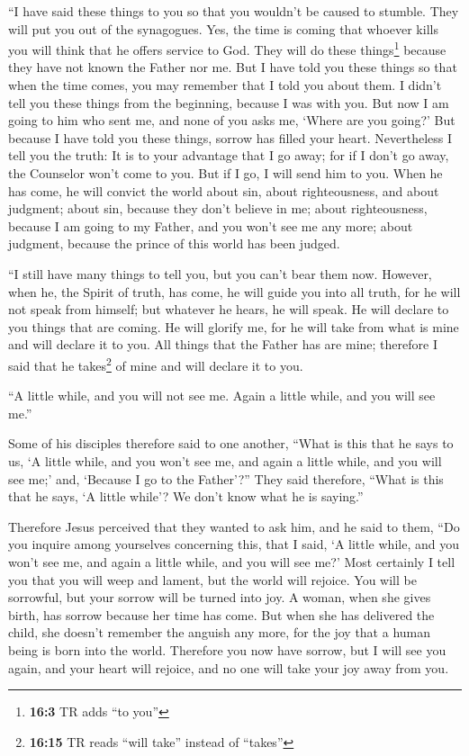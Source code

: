  ``I have said these things to you so that you wouldn't be
caused to stumble.  They will put you out of the
synagogues. Yes, the time is coming that whoever kills you will think
that he offers service to God.  They will do these
things\footnote{\textbf{16:3} TR adds ``to you''} because they have not
known the Father nor me.  But I have told you these things
so that when the time comes, you may remember that I told you about
them. I didn't tell you these things from the beginning, because I was
with you.  But now I am going to him who sent me, and none
of you asks me, `Where are you going?'  But because I have
told you these things, sorrow has filled your heart. 
Nevertheless I tell you the truth: It is to your advantage that I go
away; for if I don't go away, the Counselor won't come to you. But if I
go, I will send him to you.  When he has come, he will
convict the world about sin, about righteousness, and about judgment;
 about sin, because they don't believe in me;
 about righteousness, because I am going to my Father,
and you won't see me any more;  about judgment, because
the prince of this world has been judged.

 ``I still have many things to tell you, but you can't
bear them now.  However, when he, the Spirit of truth,
has come, he will guide you into all truth, for he will not speak from
himself; but whatever he hears, he will speak. He will declare to you
things that are coming.  He will glorify me, for he will
take from what is mine and will declare it to you.  All
things that the Father has are mine; therefore I said that he
takes\footnote{\textbf{16:15} TR reads ``will take'' instead of
  ``takes''} of mine and will declare it to you.

 ``A little while, and you will not see me. Again a
little while, and you will see me.''

 Some of his disciples therefore said to one another,
``What is this that he says to us, `A little while, and you won't see
me, and again a little while, and you will see me;' and, `Because I go
to the Father'?''  They said therefore, ``What is this
that he says, `A little while'? We don't know what he is saying.''

 Therefore Jesus perceived that they wanted to ask him,
and he said to them, ``Do you inquire among yourselves concerning this,
that I said, `A little while, and you won't see me, and again a little
while, and you will see me?'  Most certainly I tell you
that you will weep and lament, but the world will rejoice. You will be
sorrowful, but your sorrow will be turned into joy.  A
woman, when she gives birth, has sorrow because her time has come. But
when she has delivered the child, she doesn't remember the anguish any
more, for the joy that a human being is born into the world.
 Therefore you now have sorrow, but I will see you again,
and your heart will rejoice, and no one will take your joy away from
you.

